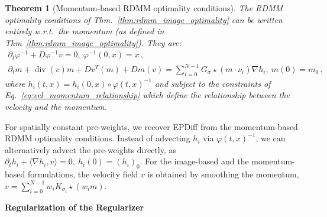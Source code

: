 \documentclass{article}
\numberwithin{equation}{section}
\newtheorem{theorem}{Theorem}
\let\on=\operatorname
\newcommand{\wrt}{{w.r.t.}}
\begin{document}
\begin{theorem}[Momentum-based RDMM optimality conditions]\label{thm:rdmm_momentum_optimality} The RDMM optimality conditions of Thm.~\eqref{thm:rdmm_image_optimality} can be written entirely \wrt~the momentum (as defined in Thm~\eqref{thm:rdmm_image_optimality}). They are:
\begin{gather}\label{EqREPDiff}
\partial_t \varphi^{-1} + D\varphi^{-1}v=0,~\varphi^{-1}(0,x)=x\,,\\
    \partial_t m + \on{div}(v) m + D v^T(m) + D m(v) =  \sum_{i=0}^{N-1} G_\sigma \star (m \cdot \nu_i ) \nabla h_i,~m(0)=m_0\label{GEPDiff}\,,    
\end{gather}
where $h_{i}(t,x) = h_i(0,x)\circ \varphi(t,x)^{-1}$ and 
subject to the constraints of Eq.~\eqref{eq:vel_momentum_relationship} which define the relationship between the velocity and the momentum. 
\end{theorem}

For spatially constant pre-weights, we recover EPDiff from the momentum-based RDMM optimality conditions. Instead of advecting $h_i$ via $\varphi(t,x)^{-1}$, we can alternatively advect the pre-weights directly, as $\partial_t h_i + \langle \nabla h_i,v\rangle=0,~h_i(0)=(h_i)_0$. For the image-based and the momentum-based formulations, the velocity field $v$ is obtained by smoothing the momentum, $v=\sum_{i =0}^{N-1} w_i K_{\sigma_i} \star (w_i m)$. 










{\bf Regularization of the Regularizer}
\end{document}
